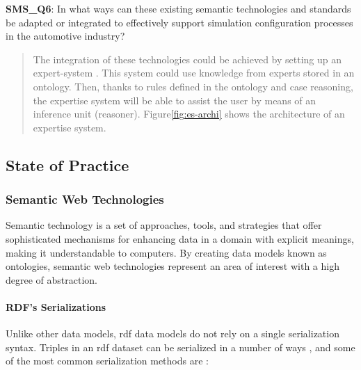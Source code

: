             \textbf{SMS\_Q6}: In what ways can these existing semantic technologies and standards be adapted or integrated to effectively support simulation configuration processes in the automotive industry?
            \begin{quote}
                The integration of these technologies could be achieved by setting up an expert-system \cite{happel2006applications}. This system could use knowledge from experts stored in an ontology. Then, thanks to rules defined in the ontology and case reasoning, the expertise system will be able to assist the user by means of an inference unit (reasoner).  Figure\ref{fig:es-archi} shows the architecture of an expertise system.\\
            \end{quote}
        
    \subsection{State of Practice}
        \subsubsection{Semantic Web Technologies\label{sec:semtec}}
        Semantic technology is a set of approaches, tools, and strategies that offer sophisticated mechanisms for enhancing data in a domain with explicit meanings, making it understandable to computers. By creating data models known as ontologies, semantic web technologies represent an area of interest with a high degree of abstraction.\\ 
        
            \paragraph{RDF's Serializations}
                Unlike other data models, \acrshort{rdf} data models do not rely on a single serialization syntax. Triples in an \acrshort{rdf} dataset can be serialized in a number of ways \cite{martinez2012exchange}, and some of the most common serialization methods are : 

